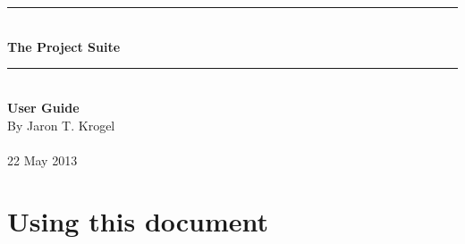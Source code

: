 \documentclass[oneside,11pt]{memoir}
\numberwithin{equation}{section}
\newcommand{\HRule}{\rule{\linewidth}{0.5mm}}
\newenvironment{changemargin}[2]{%
\begin{list}{}{%
\setlength{\leftmargin}{#1}%
\setlength{\rightmargin}{#2}%
}%
\item[]}{\end{list}}
\begin{document}


\thispagestyle{empty}
\begin{changemargin}{-1cm}{-1cm}
  \begin{center}
    \hspace{1cm}\\
    \hspace{1cm}\\
    \hspace{1cm}\\
    \hspace{1cm}\\
    \hspace{1cm}\\
    \hspace{1cm}\\
    \hspace{1cm}\\
    \hspace{1cm}\\
    \hspace{1cm}\\
    \hspace{1cm}\\
    \hspace{1cm}\\
    \hspace{1cm}\\
    \HRule\\
    \vspace{4mm}
    \textbf{\fontsize{40}{45}\selectfont The Project Suite} \\ 
    \HRule\\
    \vspace{1cm}
    \textbf{\fontsize{35}{40}\selectfont User Guide}\\
    \vspace{6cm}
    By Jaron T. Krogel \\
    \hspace{1cm}\\
    22 May 2013
  \end{center}
\end{changemargin}
\pagebreak

\tableofcontents


\mainmatter

\pagebreak
\chapter{Using this document} \label{usedoc}
\end{document}
